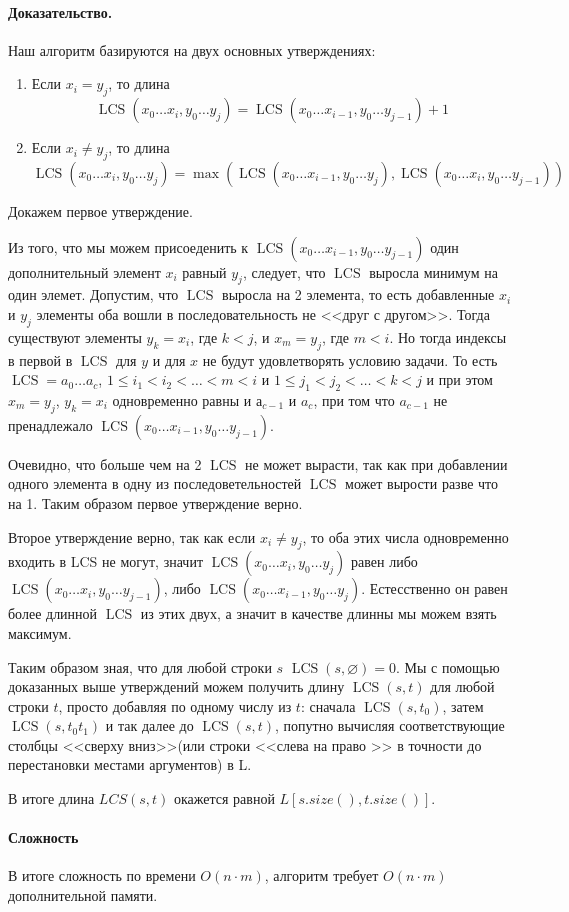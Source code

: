\documentclass[12pt]{article}
\newcommand{\LCS}{\operatorname{LCS}}
\begin{document}
\paragraph{Доказательство.}
Наш алгоритм базируются на двух основных утверждениях:
\begin{enumerate}
    \item Если $ x_i = y_j $, то длина $$ \LCS(x_0 \dots x_i, y_0 \dots y_j) = 
    \LCS(x_0 \dots x_{i - 1}, y_0 \dots y_{j - 1}) + 1 $$
    
    \item Если $ x_i \ne y_j $, то длина $$ \LCS(x_0 \dots x_i, y_0 \dots y_j) =
    \max(\LCS(x_0 \dots x_{i - 1}, y_0 \dots y_j), \LCS(x_0 \dots x_i, y_0
    \dots y_{j - 1})) $$
\end{enumerate}

Докажем первое утверждение.

Из того, что мы можем присоеденить к $ \LCS(x_0 \dots x_{i - 1}, y_0 \dots y_{j - 1}) $ 
один дополнительный элемент $ x_i $ равный $ y_j $, следует, что $ \LCS $ выросла
минимум на один элемет. Допустим, что $ \LCS $ выросла на 2 элемента, то есть добавленные
$ x_i $ и $ y_j $ элементы оба вошли в последовательность не <<друг с другом>>. Тогда
существуют элементы $ y_k = x_i $, где $ k < j $, и $ x_m = y_j $, где $ m < i $. Но тогда
индексы в первой в $ \LCS $ для $ y $ и для $ x $ не будут удовлетворять условию задачи.
То есть $ \LCS = a_0 \dots a_c $, 
$ 1 \le i_1 < i_2 < \dots < m < i $ и $ 1 \le j_1 < j_2 < \dots < k < j $ и
при этом $ x_m = y_j $, $ y_k = x_i $ одновременно равны и $ а_{c-1}$ и $ a_c $, при том
что $ a_{c - 1} $ не пренадлежало $ \LCS(x_0 \dots x_{i - 1}, y_0 \dots y_{j - 1}) $.

Очевидно, что больше чем на 2 $ \LCS $ не может вырасти, так как при добавлении одного
элемента в одну из последоветельностей $ \LCS $ может вырости разве что на 1.
Таким образом первое утверждение верно.

Второе утверждение верно, так как если $ x_i \ne y_j $, то оба этих числа
одновременно входить в LCS не могут, значит $ \LCS(x_0 \dots x_i, y_0 \dots y_j)$
равен либо $ \LCS(x_0 \dots x_i, y_0 \dots y_{j - 1}) $, либо
$ \LCS(x_0 \dots x_{i - 1}, y_0 \dots y_j) $. Естесственно он равен более длинной
$ \LCS $ из этих двух, а значит в качестве длинны мы можем взять максимум.

Таким образом зная, что для любой строки $ s $ $ \LCS(s, \varnothing) = 0 $.
Мы с помощью доказанных выше утверждений можем получить длину $ \LCS(s, t) $ 
для любой строки $ t $, просто добавляя по одному числу из $ t $: сначала 
$ \LCS(s, t_0) $, затем $ \LCS(s, t_0t_1) $ и так далее до $ \LCS(s, t) $,
попутно вычисляя соответствующие столбцы <<сверху вниз>>(или строки <<слева на 
право >> в точности до перестановки местами аргументов) в L.

В итоге длина $ LCS(s , t) $ окажется равной $ L[s.size(), t.size()] $.

\paragraph{Сложность}
В итоге сложность по времени $ O(n \cdot m) $, алгоритм требует $ O(n \cdot m) $ дополнительной памяти.
\end{document}
